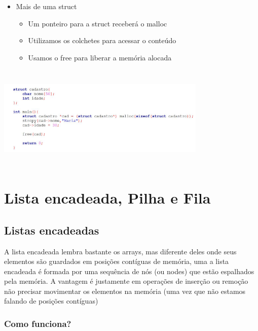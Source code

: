 \documentclass{report}
\begin{document}
	\begin{itemize}
		\item Mais de uma struct
		\begin{itemize}
			\item Um ponteiro para a struct receberá o malloc
			\item Utilizamos os colchetes para acessar o conteúdo
			\item Usamos o free para liberar a memória alocada	
		\end{itemize} 
	\end{itemize}
	
	\begin{center}
		
		\includegraphics[width=10cm,height=5cm,keepaspectratio=false]{imagens/alocstruct1.png}
		
	\end{center}
	
	\chapter{Lista encadeada, Pilha e Fila}
	
	\section{Listas encadeadas}
	
	A lista encadeada lembra bastante os arrays, mas diferente deles onde seus elementos são guardados em posições contíguas de memória, uma a lista encadeada é formada por uma sequência de nós (ou nodes) que estão espalhados pela memória. A vantagem é justamente em operações de inserção ou remoção não precisar movimentar os elementos na memória (uma vez que não estamos falando de posições contíguas)
	
	\subsection{Como funciona?}
	
\end{document}
